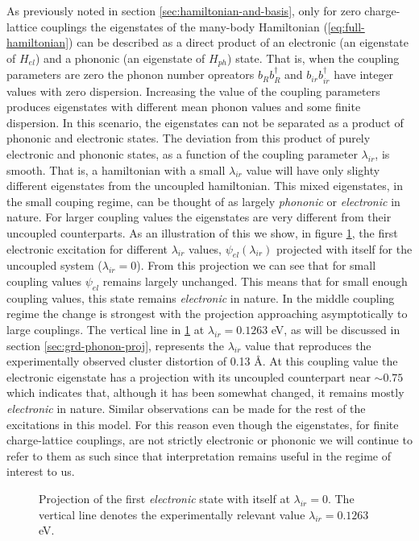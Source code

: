As previously noted in section \ref{sec:hamiltonian-and-basis}, only for zero charge-lattice couplings the eigenstates of the many-body Hamiltonian (\ref{eq:full-hamiltonian}) can be described as a direct product of an electronic (an eigenstate of $H_{el}$) and a phononic (an eigenstate of $H_{ph}$) state.
That is, when the coupling parameters are zero the phonon number opreators $b_Rb^\dagger_R$ and $b_{ir}b^\dagger_{ir}$ have integer values with zero dispersion.
Increasing the value of the coupling parameters produces eigenstates with different mean phonon values and some finite dispersion.
In this scenario, the eigenstates can not be separated as a product of phononic and electronic states.
The deviation from this product of purely electronic and phononic states, as a function of the coupling parameter $\lambda_{ir}$, is smooth.
That is, a hamiltonian with a small $\lambda_{ir}$ value will have only slighty different eigenstates from the uncoupled hamiltonian.
This mixed eigenstates, in the small couping regime, can be thought of as largely \textit{phononic} or \textit{electronic} in nature.
For larger coupling values the eigenstates are very different from their uncoupled counterparts.
As an illustration of this we show, in figure \ref{fig:electr-proj}, the first electronic excitation for different $\lambda_{ir}$ values, $\psi_{el}(\lambda_{ir})$ projected with itself for the uncoupled system ($\lambda_{ir}=0$).
From this projection we can see that for small coupling values $\psi_{el}$ remains largely unchanged.
This means that for small enough coupling values, this state remains \textit{electronic} in nature.
In the middle coupling regime the change is strongest with the projection approaching asymptotically to large couplings.
The vertical line in \ref{fig:electr-proj} at $\lambda_{ir}=0.1263$ eV, as will be discussed in section \ref{sec:grd-phonon-proj}, represents the $\lambda_{ir}$ value that reproduces the experimentally observed cluster distortion of 0.13 \AA.
At this coupling value the electronic eigenstate has a projection with its uncoupled counterpart near $\sim 0.75$ which indicates that, although it has been somewhat changed, it remains mostly \textit{electronic} in nature.
Similar observations can be made for the rest of the excitations in this model.
For this reason even though the eigenstates, for finite charge-lattice couplings, are not strictly electronic or phononic we will continue to refer to them as such since that interpretation remains useful in the regime of interest to us.
%
\begin{figure}[h]
  \centering
  
  \caption[Projection of the first \textit{electronic} state with itself at $\lambda_{ir}=0$.]
  {Projection of the first \textit{electronic} state with itself at $\lambda_{ir}=0$.
    The vertical line denotes the experimentally relevant value $\lambda_{ir}=0.1263$ eV.}
  \label{fig:electr-proj}
\end{figure}

